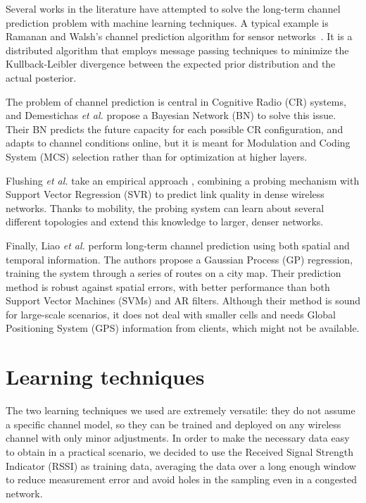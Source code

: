 \documentclass[conference, a4paper]{IEEEtran}
\begin{document}
Several works in the literature have attempted to solve the long-term channel prediction problem with machine learning techniques. A typical example is Ramanan and Walsh's channel prediction algorithm for sensor networks~\cite{ramanan2010distributed}. It is a distributed algorithm that employs message passing techniques to minimize the Kullback-Leibler divergence between the expected prior distribution and the actual posterior.

The problem of channel prediction is central in Cognitive Radio (CR) systems, and Demestichas \emph{et al.} propose a Bayesian Network (BN) \cite{demestichas2009enhancing} to solve this issue. Their BN predicts the future capacity for each possible CR configuration, and adapts to channel conditions online, but it is meant for Modulation and Coding System (MCS) selection rather than for optimization at higher layers.

Flushing \emph{et al.} take an empirical approach \cite{flushing2012mobility}, combining a probing mechanism with Support Vector Regression (SVR) to predict link quality in dense wireless networks. Thanks to mobility, the probing system can learn about several different topologies and extend this knowledge to larger, denser networks.

Finally, Liao \emph{et al.} perform long-term channel prediction \cite{liao2015channel} using both spatial and temporal information. The authors propose a Gaussian Process (GP) regression, training the system through a series of routes on a city map. Their prediction method is robust against spatial errors, with better performance than both Support Vector Machines (SVMs) and AR filters. Although their method is sound for large-scale scenarios, it does not deal with smaller cells and needs Global Positioning System (GPS) information from clients, which might not be available.

\section{Learning techniques}

The two learning techniques we used are extremely versatile: they do not assume a specific channel model, so they can be trained and deployed on any wireless channel with only minor adjustments. In order to make the necessary data easy to obtain in a practical scenario, we decided to use the Received Signal Strength Indicator (RSSI) \cite{wu2008study} as training data, averaging the data over a long enough window to reduce measurement error and avoid holes in the sampling even in a congested network.
\end{document}
